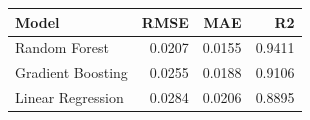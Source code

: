 \begin{tabular}{lrrr}
\toprule
Model & RMSE & MAE & R2 \\
\midrule
Random Forest & 0.0207 & 0.0155 & 0.9411 \\
Gradient Boosting & 0.0255 & 0.0188 & 0.9106 \\
Linear Regression & 0.0284 & 0.0206 & 0.8895 \\
\bottomrule
\end{tabular}

